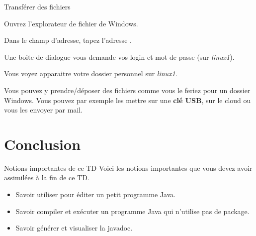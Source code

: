 \documentclass[a4paper,11pt]{style-esi/td}
\begin{document}
	\begin{Tutoriel}{Transférer des fichiers}
	\begin{steps}		
		\item 
			Ouvrez l'explorateur de fichier de Windows.
		\item 
			Dans le champ d'adresse, tapez l'adresse .
		\item 
			Une boite de dialogue vous demande vos login et mot de passe (sur \textit{linux1}).
		\item 
			Vous voyez apparaitre votre dossier personnel sur \textit{linux1}. 
		\item 
			Vous pouvez y prendre/déposer des fichiers comme vous le feriez pour un dossier Windows. 
			Vous pouvez par exemple les mettre sur une \textbf{clé USB},
			sur le cloud ou vous les envoyer par mail.
	\end{steps}
	\end{Tutoriel}			

\section{Conclusion}

	\begin{theorie}{Notions importantes de ce TD}
		Voici les notions importantes que vous devez avoir assimilées à la fin de ce TD.
		\begin{itemize}
		\item 
			Savoir utiliser  pour éditer un petit programme Java.
		\item 
			Savoir compiler et exécuter un programme Java 
			qui n'utilise pas de package.
		\item 
			Savoir générer et visualiser la javadoc.
		\end{itemize}
	\end{theorie}


		
\end{document}
